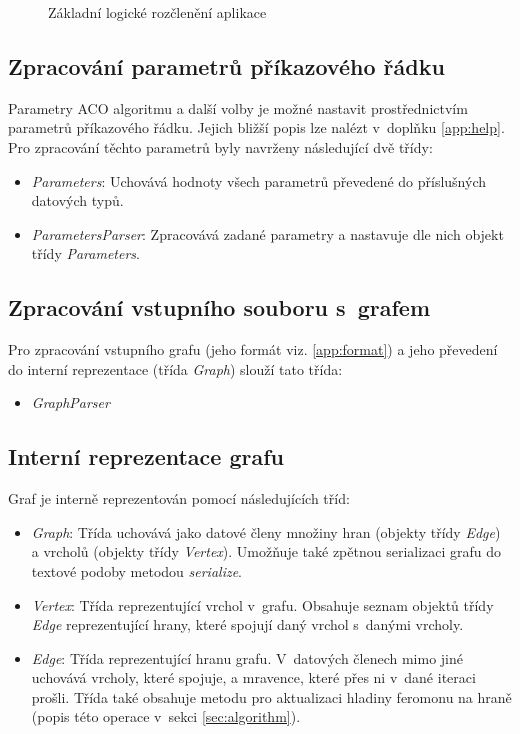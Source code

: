 \documentclass[a4paper, 12pt]{article}
\begin{document}
\begin{figure}[b]
  \begin{center}
    
  \end{center}
\caption{Základní logické rozčlenění aplikace}
\label{img:logika}
\end{figure}


\subsection{Zpracování parametrů příkazového řádku}
\label{subsec:process}
Parametry ACO algoritmu a další volby je možné nastavit prostřednictvím parametrů příkazového řádku. Jejich bližší popis lze nalézt v~doplňku \ref{app:help}.
Pro zpracování těchto parametrů byly navrženy následující dvě třídy:
\begin{itemize}
  \item \emph{Parameters}: Uchovává hodnoty všech parametrů převedené do příslušných datových typů.
  \item \emph{ParametersParser}: Zpracovává zadané parametry a nastavuje dle nich objekt třídy \emph{Parameters}.
\end{itemize}

\subsection{Zpracování vstupního souboru s~grafem}
Pro zpracování vstupního grafu (jeho formát viz. \ref{app:format}) a jeho převedení do interní reprezentace (třída \emph{Graph}) slouží tato třída:
\begin{itemize}
  \item \emph{GraphParser}
\end{itemize}

\subsection{Interní reprezentace grafu}
\label{subsec:graph}
Graf je interně reprezentován pomocí následujících tříd:
\begin{itemize}
  \item \emph{Graph}: Třída uchovává jako datové členy množiny hran (objekty třídy \emph{Edge}) a vrcholů (objekty třídy \emph{Vertex}).
    Umožňuje také zpětnou serializaci grafu do textové podoby metodou \emph{serialize}.

  \item \emph{Vertex}: Třída reprezentující vrchol v~grafu. Obsahuje seznam objektů třídy \emph{Edge} reprezentující hrany, které spojují daný vrchol s~danými
    vrcholy.

  \item \emph{Edge}: Třída reprezentující hranu grafu. V~datových členech mimo jiné uchovává vrcholy, které spojuje,
    a mravence, které přes ni v~dané iteraci prošli. Třída také obsahuje metodu pro aktualizaci hladiny feromonu na hraně
    (popis této operace v~sekci \ref{sec:algorithm}).
\end{itemize}
\end{document}
